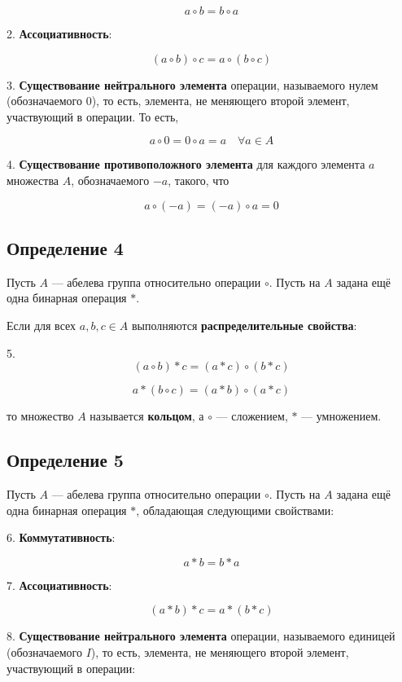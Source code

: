 {\[
a \circ b = b \circ a
\]

2. \textbf{Ассоциативность}:

\[
(a \circ b) \circ c = a \circ (b \circ c)
\]



3. \textbf{Существование нейтрального элемента} операции, называемого нулем (обозначаемого \( 0 \)), то есть, элемента, не меняющего второй элемент, участвующий в операции. То есть,

\[
a \circ 0 = 0 \circ a = a \quad \forall a \in A
\]

4. \textbf{Существование противоположного элемента} для каждого элемента \( a \) множества \( A \), обозначаемого \( -a \), такого, что

\[
a \circ (-a) = (-a) \circ a = 0
\]

\subsection*{Определение 4}

Пусть \( A \) — абелева группа относительно операции \( \circ \). Пусть на \( A \) задана ещё одна бинарная операция \( * \).

Если для всех \( a, b, c \in A \) выполняются \textbf{распределительные свойства}:

5.
\[
(a \circ b) * c = (a * c) \circ (b * c)
\]

\[
a * (b \circ c) = (a * b) \circ (a * c)
\]

то множество \( A \) называется \textbf{кольцом}, а \( \circ \) — сложением, \( * \) — умножением.

\subsection*{Определение 5}

Пусть \( A \) — абелева группа относительно операции \( \circ \). Пусть на \( A \) задана ещё одна бинарная операция \( * \), обладающая следующими свойствами:

6. \textbf{Коммутативность}: 


\[
a * b = b * a
\]



7. \textbf{Ассоциативность}: 


\[
(a * b) * c = a * (b * c)
\]



8. \textbf{Существование нейтрального элемента} операции, называемого единицей (обозначаемого \( I \)), то есть, элемента, не меняющего второй элемент, участвующий в операции:


}
